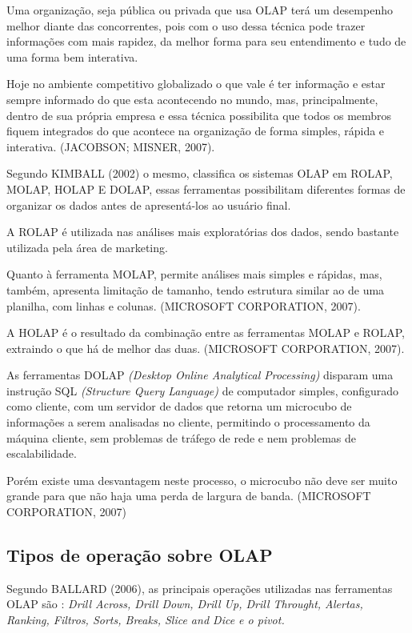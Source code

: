 Uma organiza\c{c}\~{a}o, seja pública ou privada que usa OLAP terá um desempenho melhor diante das concorrentes, pois com o uso dessa técnica pode trazer informações com mais rapidez, da melhor forma para seu entendimento e tudo de uma forma bem interativa. 

Hoje no ambiente competitivo globalizado o que vale é ter informação e estar sempre informado do que esta acontecendo no mundo, mas, principalmente, dentro de sua própria empresa e essa técnica possibilita que todos os membros fiquem integrados do que acontece na organização de forma simples, rápida e interativa. (JACOBSON; MISNER, 2007).

Segundo KIMBALL (2002) o mesmo, classifica os sistemas OLAP em ROLAP, MOLAP, HOLAP E DOLAP, essas ferramentas possibilitam diferentes formas de organizar os dados antes de apresentá-los ao usuário final.

A ROLAP é utilizada nas análises mais exploratórias dos dados, sendo bastante utilizada pela área de marketing. 

Quanto à ferramenta MOLAP, permite análises mais simples e rápidas, mas, também, apresenta limitação de tamanho, tendo estrutura similar ao de uma planilha, com linhas e colunas. (MICROSOFT CORPORATION, 2007).

A HOLAP é o resultado da combinação entre as ferramentas MOLAP e ROLAP, extraindo o que há de melhor das duas. (MICROSOFT CORPORATION, 2007).

As ferramentas DOLAP \textit{(Desktop Online Analytical Processing)} disparam uma instrução
SQL \textit{(Structure Query Language)} de computador simples, configurado como cliente, com um servidor de dados que retorna um microcubo de informações a serem analisadas no cliente, permitindo o processamento da máquina cliente, sem problemas de tráfego de rede e nem problemas de escalabilidade. 

Porém existe uma desvantagem neste processo, o microcubo não deve ser muito grande para que não haja uma perda de largura de banda. (MICROSOFT CORPORATION, 2007)

\subsection{Tipos de opera\c{c}\~{a}o sobre OLAP}

Segundo BALLARD (2006), as principais operações utilizadas nas ferramentas OLAP são : \textit{Drill Across, Drill Down, Drill Up, Drill Throught, Alertas, Ranking, Filtros, Sorts, Breaks, Slice and Dice e o pivot.}

